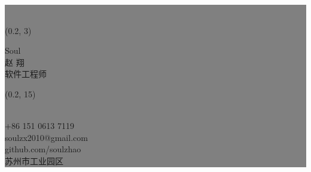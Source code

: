 \documentclass[a4paper,landscape]{article}
\makeatletter
\newcounter{colorCounter}
\def\@sectioncolor#1#2{%
  {%
    \color{%
      \ifcase\value{colorCounter}%
        blue\or%
        red\or%
        orange\or%
        green\or%
        purple\or%
        brown\else%
        headercolor\fi%
    } #1#2%
  }%
  \stepcounter{colorCounter}%
}
\renewcommand{\section}[1]{
  \par\vspace{\baselineskip}
  {%
    \LARGE\headingfont\color{headercolor}%
    \@sectioncolor #1%
  }
  \par\vspace{\baselineskip}
}
\makeatother
\begin{document}
\setlength{\fboxsep}{0pt}
 \colorbox{gray}{
  \begin{minipage}[t][\paperheight]{0.2\paperwidth}
    \begin{flushright}
        \fontsize{40pt}{72pt}\color{gray}{\_\_\_}%
      \\
        \begin{textblock}{5.5}(0.2, 3)
        \begin{flushright}
            \fontsize{40pt}{72pt}\color{white}%
              {\bodyfont Soul}
             \vspace{0.3cm}\\
             \fontsize{14pt}{24pt}\color{white}%
              {\thinfont 赵 翔}
              \vspace{0.3cm}\\
             \fontsize{10pt}{12pt}\color{white}%
              {\thinfont 软件工程师}%
         \end{flushright}
        \end{textblock}

        \begin{textblock}{5.5}(0.2, 15)
        \begin{flushright}
            \let\oldsection\section
            \renewcommand{\section}[1]{
                    \par\vspace{\baselineskip}{\Large\headingfont\color{white} \hfill#1}
            }
            
            \section{联系方式}
            \\
            {\fontsize{10pt}{12pt}\color{white}+86 151 0613 7119}
		 \\
            {\fontsize{10pt}{12pt}\color{white}soulzx2010@gmail.com}
		 \\
		 {\fontsize{10pt}{12pt}\color{white}github.com/soulzhao}
            \\
            {\fontsize{10pt}{12pt}\color{white}苏州市工业园区}
		  ~
            \let\section\oldsection
         \end{flushright}
        \end{textblock}
    \end{flushright}
\end{minipage}
}
\end{document}
